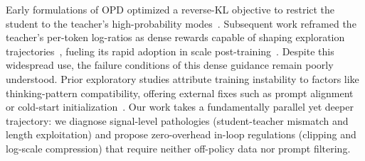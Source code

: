 \documentclass[11pt]{article}
\begin{document}
Early formulations of OPD optimized a reverse-KL objective to restrict the student to the teacher's high-probability modes~\citep{gu2026minillmonpolicydistillationlarge,GKD2024}. Subsequent work reframed the teacher's per-token log-ratios as dense rewards capable of shaping exploration trajectories~\citep{gopd}, fueling its rapid adoption in scale post-training~\citep{deepseekai2026deepseekv4,qwen3,glm5team2026glm5vibecodingagentic,Nemotron-Cascade-2}.
Despite this widespread use, the failure conditions of this dense guidance remain poorly understood. 
Prior exploratory studies attribute training instability to factors like thinking-pattern compatibility, offering external fixes such as prompt alignment or cold-start initialization~\cite{li2026rethinkingonpolicydistillationlarge,opd-var-1,yu2026dopddualonpolicydistillation}. 
Our work takes a fundamentally parallel yet deeper trajectory: we diagnose signal-level pathologies (student-teacher mismatch and length exploitation) and propose zero-overhead in-loop regulations (clipping and log-scale compression) that require neither off-policy data nor prompt filtering.





\end{document}
